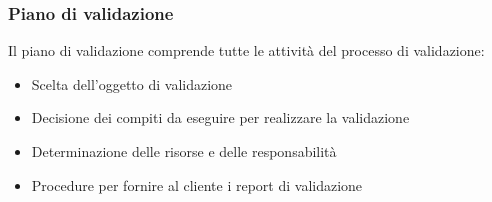 \documentclass[../norme-di-progetto.tex]{subfiles}
\begin{document}
\subsubsection{Piano di validazione}
\label{subs:piano di validazione}
Il piano di validazione comprende tutte le attività del processo di validazione:
\begin{itemize}
	\item Scelta dell'oggetto di validazione
	\item Decisione dei compiti da eseguire per realizzare la validazione
	\item Determinazione delle risorse e delle responsabilità
	\item Procedure per fornire al cliente i report di validazione
\end{itemize}
\end{document}
